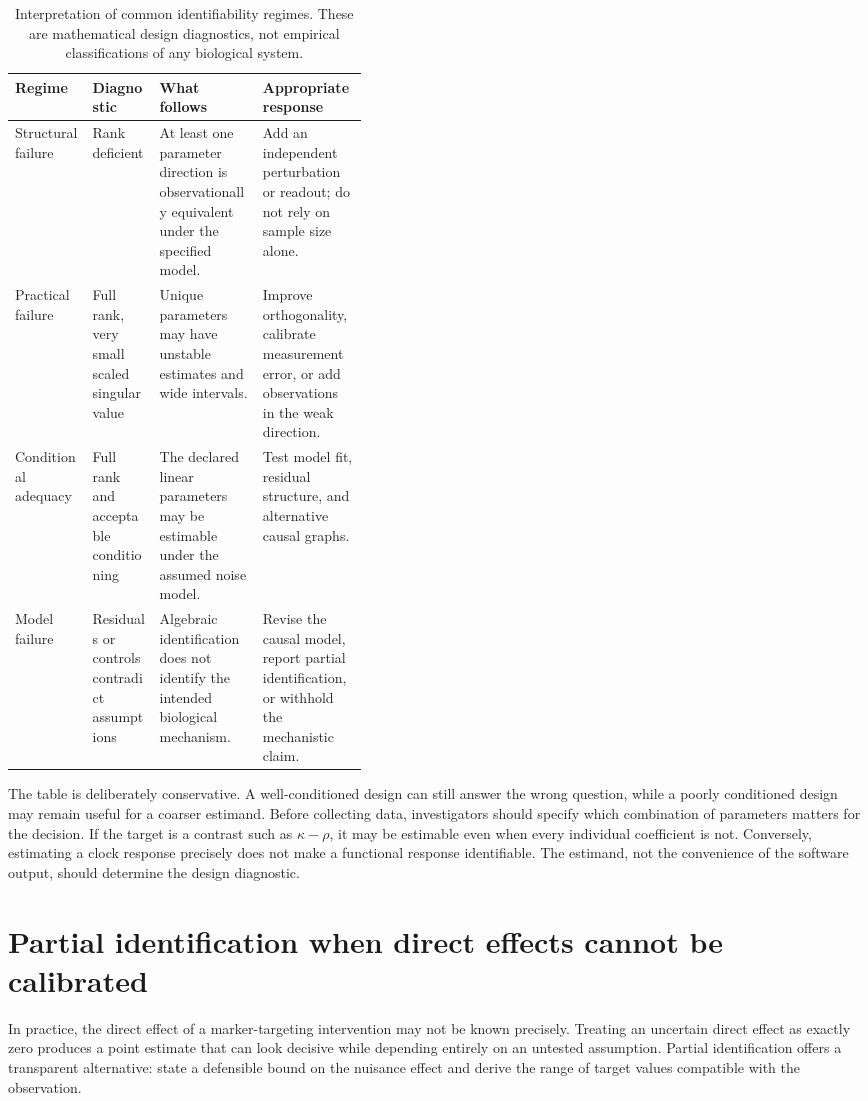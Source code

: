 \documentclass[10pt,a4paper]{article}
\begin{document}
\begin{table}[!htbp]
\centering
\caption{Interpretation of common identifiability regimes. These are mathematical design diagnostics, not empirical classifications of any biological system.}
\label{tab:identifiability-regimes}
\small
\begin{tabularx}{\linewidth}{p{0.22\linewidth} p{0.19\linewidth} X X}
\toprule
\textbf{Regime} & \textbf{Diagnostic} & \textbf{What follows} & \textbf{Appropriate response}\\
\midrule
Structural failure & Rank deficient & At least one parameter direction is observationally equivalent under the specified model. & Add an independent perturbation or readout; do not rely on sample size alone.\\
Practical failure & Full rank, very small scaled singular value & Unique parameters may have unstable estimates and wide intervals. & Improve orthogonality, calibrate measurement error, or add observations in the weak direction.\\
Conditional adequacy & Full rank and acceptable conditioning & The declared linear parameters may be estimable under the assumed noise model. & Test model fit, residual structure, and alternative causal graphs.\\
Model failure & Residuals or controls contradict assumptions & Algebraic identification does not identify the intended biological mechanism. & Revise the causal model, report partial identification, or withhold the mechanistic claim.\\
\bottomrule
\end{tabularx}
\end{table}

The table is deliberately conservative. A well-conditioned design can still answer the wrong question, while a poorly conditioned design may remain useful for a coarser estimand. Before collecting data, investigators should specify which combination of parameters matters for the decision. If the target is a contrast such as \(\kappa-\rho\), it may be estimable even when every individual coefficient is not. Conversely, estimating a clock response precisely does not make a functional response identifiable. The estimand, not the convenience of the software output, should determine the design diagnostic.

\section{Partial identification when direct effects cannot be calibrated}
In practice, the direct effect of a marker-targeting intervention may not be known precisely. Treating an uncertain direct effect as exactly zero produces a point estimate that can look decisive while depending entirely on an untested assumption. Partial identification offers a transparent alternative: state a defensible bound on the nuisance effect and derive the range of target values compatible with the observation.
\end{document}
